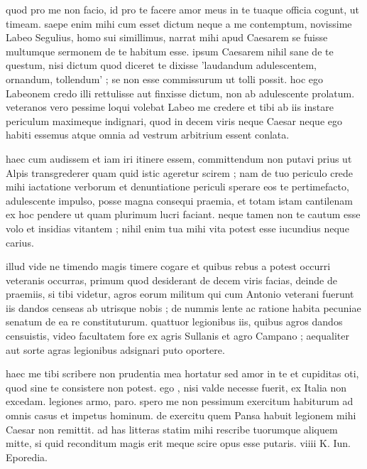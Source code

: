 


 quod pro me non facio, id pro te facere amor meus in te tuaque officia cogunt, ut timeam. saepe enim mihi cum esset dictum neque a me contemptum, novissime Labeo Segulius, homo sui simillimus, narrat mihi apud Caesarem se fuisse multumque sermonem de te habitum esse. ipsum Caesarem nihil sane de te questum, nisi dictum quod diceret te dixisse 'laudandum adulescentem, ornandum, tollendum' ; se non esse commissurum ut tolli possit. hoc ego Labeonem credo illi rettulisse aut finxisse dictum, non ab adulescente prolatum. veteranos vero pessime loqui volebat Labeo me credere et tibi ab iis instare periculum maximeque indignari, quod in decem viris neque Caesar neque ego habiti essemus atque omnia ad vestrum arbitrium essent conlata.

 haec cum audissem et iam iri itinere essem, committendum non putavi prius ut Alpis transgrederer quam quid istic ageretur scirem ; nam de tuo periculo crede mihi iactatione verborum et denuntiatione periculi sperare eos te pertimefacto, adulescente impulso, posse magna consequi praemia, et totam istam cantilenam ex hoc pendere ut quam plurimum lucri faciant. neque tamen non te cautum esse volo et insidias vitantem ; nihil enim tua mihi vita potest esse iucundius neque carius.

 illud vide ne timendo magis timere cogare et quibus rebus a potest occurri veteranis occurras, primum quod desiderant de decem viris facias, deinde de praemiis, si tibi videtur, agros eorum militum qui cum Antonio veterani fuerunt iis dandos censeas ab utrisque nobis ; de nummis lente ac ratione habita pecuniae senatum de ea re constituturum. quattuor legionibus iis, quibus agros dandos censuistis, video facultatem fore ex agris Sullanis et agro Campano ; aequaliter aut sorte agras legionibus adsignari puto oportere.

 haec me tibi scribere non prudentia mea hortatur sed amor in te et cupiditas oti, quod sine te consistere non potest. ego , nisi valde necesse fuerit, ex Italia non excedam. legiones armo, paro. spero me non pessimum exercitum habiturum ad omnis casus et impetus hominum. de exercitu quem Pansa habuit legionem mihi Caesar non remittit. ad has litteras statim mihi rescribe tuorumque aliquem mitte, si quid reconditum magis erit meque scire opus esse putaris. viiii K. Iun. Eporedia.
